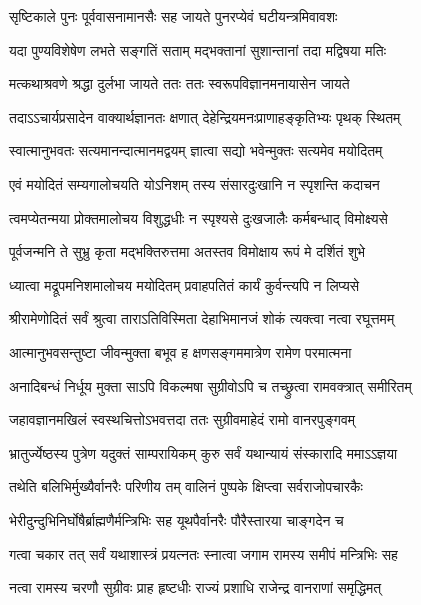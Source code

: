 \twolineshloka
{सृष्टिकाले पुनः पूर्ववासनामानसैः सह}
{जायते पुनरप्येवं घटीयन्त्रमिवावशः} %

\twolineshloka
{यदा पुण्यविशेषेण लभते सङ्गतिं सताम्}
{मद्भक्तानां सुशान्तानां तदा मद्विषया मतिः} %

\twolineshloka
{मत्कथाश्रवणे श्रद्धा दुर्लभा जायते ततः}
{ततः स्वरूपविज्ञानमनायासेन जायते} %

\twolineshloka
{तदाऽऽचार्यप्रसादेन वाक्यार्थज्ञानतः क्षणात्}
{देहेन्द्रियमनःप्राणाहङ्कृतिभ्यः पृथक् स्थितम्} %

\twolineshloka
{स्वात्मानुभवतः सत्यमानन्दात्मानमद्वयम्}
{ज्ञात्वा सद्यो भवेन्मुक्तः सत्यमेव मयोदितम्} %

\twolineshloka
{एवं मयोदितं सम्यगालोचयति योऽनिशम्}
{तस्य संसारदुःखानि न स्पृशन्ति कदाचन} %

\twolineshloka
{त्वमप्येतन्मया प्रोक्तमालोचय विशुद्धधीः}
{न स्पृश्यसे दुःखजालैः कर्मबन्धाद् विमोक्ष्यसे} %

\twolineshloka
{पूर्वजन्मनि ते सुभ्रु कृता मद्भक्तिरुत्तमा}
{अतस्तव विमोक्षाय रूपं मे दर्शितं शुभे} %

\twolineshloka
{ध्यात्वा मद्रूपमनिशमालोचय मयोदितम्}
{प्रवाहपतितं कार्यं कुर्वन्त्यपि न लिप्यसे} %

\twolineshloka
{श्रीरामेणोदितं सर्वं श्रुत्वा ताराऽतिविस्मिता}
{देहाभिमानजं शोकं त्यक्त्वा नत्वा रघूत्तमम्} %

\twolineshloka
{आत्मानुभवसन्तुष्टा जीवन्मुक्ता बभूव ह}
{क्षणसङ्गममात्रेण रामेण परमात्मना} %

\twolineshloka
{अनादिबन्धं निर्धूय मुक्ता साऽपि विकल्मषा}
{सुग्रीवोऽपि च तच्छ्रुत्वा रामवक्त्रात् समीरितम्} %

\twolineshloka
{जहावज्ञानमखिलं स्वस्थचित्तोऽभवत्तदा}
{ततः सुग्रीवमाहेदं रामो वानरपुङ्गवम्} %

\twolineshloka
{भ्रातुर्ज्येष्ठस्य पुत्रेण यदुक्तं साम्परायिकम्}
{कुरु सर्वं यथान्यायं संस्कारादि ममाऽऽज्ञया} %

\twolineshloka
{तथेति बलिभिर्मुख्यैर्वानरैः परिणीय तम्}
{वालिनं पुष्पके क्षिप्त्वा सर्वराजोपचारकैः} %

\twolineshloka
{भेरीदुन्दुभिनिर्घोषैर्ब्राह्मणैर्मन्त्रिभिः सह}
{यूथपैर्वानरैः पौरैस्तारया चाङ्गदेन च} %

\twolineshloka
{गत्वा चकार तत् सर्वं यथाशास्त्रं प्रयत्नतः}
{स्नात्वा जगाम रामस्य समीपं मन्त्रिभिः सह} %

\twolineshloka
{नत्वा रामस्य चरणौ सुग्रीवः प्राह हृष्टधीः}
{राज्यं प्रशाधि राजेन्द्र वानराणां समृद्धिमत्} %

